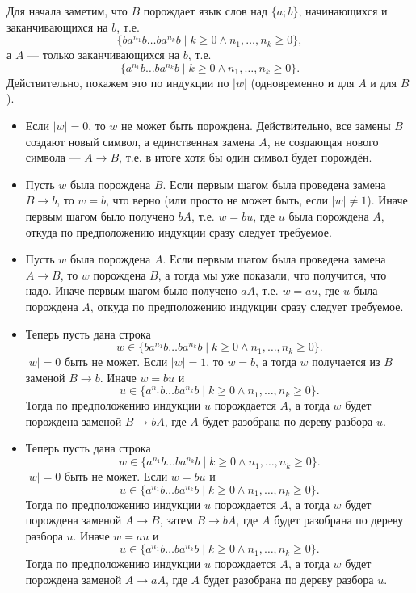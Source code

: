 \documentclass[12pt,a4paper]{article}
\begin{document}
\begin{problem}{3}
\begin{enumerate}
                Для начала заметим, что $B$ порождает язык слов над $\{a; b\}$, начинающихся и заканчивающихся на $b$, т.е.
                \[\{b a^{n_1} b \dots b a^{n_k} b \mid k \geqslant 0 \wedge n_1, \dots, n_k \geqslant 0\},\]
                а $A$ --- только заканчивающихся на $b$, т.е.
                \[\{a^{n_1} b \dots b a^{n_k} b \mid k \geqslant 0 \wedge n_1, \dots, n_k \geqslant 0\}.\]
                Действительно, покажем это по индукции по $|w|$ (одновременно и для $A$ и для $B$).
                \begin{itemize}
                    \item Если $|w| = 0$, то $w$ не может быть порождена. Действительно, все замены $B$ создают новый символ, а единственная замена $A$, не создающая нового символа --- $A \to B$, т.е. в итоге хотя бы один символ будет порождён.
                    \item Пусть $w$ была порождена $B$. Если первым шагом была проведена замена $B \to b$, то $w = b$, что верно (или просто не может быть, если $|w| \neq 1$). Иначе первым шагом было получено $bA$, т.е. $w = bu$, где $u$ была порождена $A$, откуда по предположению индукции сразу следует требуемое.
                    \item Пусть $w$ была порождена $A$. Если первым шагом была проведена замена $A \to B$, то $w$ порождена $B$, а тогда мы уже показали, что получится, что надо. Иначе первым шагом было получено $aA$, т.е. $w = au$, где $u$ была порождена $A$, откуда по предположению индукции сразу следует требуемое.
                    \item Теперь пусть дана строка
                        \[w \in \{b a^{n_1} b \dots b a^{n_k} b \mid k \geqslant 0 \wedge n_1, \dots, n_k \geqslant 0\}.\]
                        $|w| = 0$ быть не может. Если $|w| = 1$, то $w = b$, а тогда $w$ получается из $B$ заменой $B \to b$. Иначе $w = bu$ и
                        \[u \in \{a^{n_1} b \dots b a^{n_k} b \mid k \geqslant 0 \wedge n_1, \dots, n_k \geqslant 0\}.\]
                        Тогда по предположению индукции $u$ порождается $A$, а тогда $w$ будет порождена заменой $B \to bA$, где $A$ будет разобрана по дереву разбора $u$.
                    \item Теперь пусть дана строка
                        \[w \in \{a^{n_1} b \dots b a^{n_k} b \mid k \geqslant 0 \wedge n_1, \dots, n_k \geqslant 0\}.\]
                        $|w| = 0$ быть не может. Если $w = bu$ и
                        \[u \in \{a^{n_1} b \dots b a^{n_k} b \mid k \geqslant 0 \wedge n_1, \dots, n_k \geqslant 0\}.\]
                        Тогда по предположению индукции $u$ порождается $A$, а тогда $w$ будет порождена заменой $A \to B$, затем $B \to bA$, где $A$ будет разобрана по дереву разбора $u$. Иначе $w = au$ и
                        \[u \in \{a^{n_1} b \dots b a^{n_k} b \mid k \geqslant 0 \wedge n_1, \dots, n_k \geqslant 0\}.\]
                        Тогда по предположению индукции $u$ порождается $A$, а тогда $w$ будет порождена заменой $A \to aA$, где $A$ будет разобрана по дереву разбора $u$.
                \end{itemize}


\end{enumerate}
\end{problem}
\end{document}
